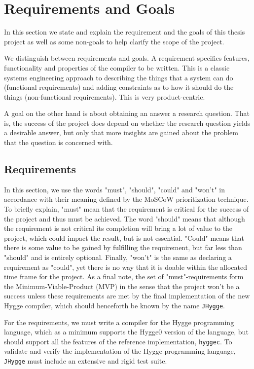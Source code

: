 \chapter{Requirements and Goals} \label{sec:requirements}

In this section we state and explain the requirement and the goals of this thesis project as well as some non-goals to help clarify the scope
of the project.

We distinguish between requirements and goals. A requirement specifies features, functionality and properties of the compiler to be written.
This is a classic systems engineering approach to describing the things that a system can do (functional requirements) and adding constraints as
to how it should do the things (non-functional requirements). This is very product-centric.

A goal on the other hand is about obtaining an answer a research question. That is, the success of the project does depend on whether the research
question yields a desirable answer, but only that more insights are gained about the problem that the question is concerned with.

\section{Requirements}

In this section, we use the words "must", "should", "could" and "won't" in accordance with their meaning defined by the MoSCoW prioritization
technique. To briefly explain, "must" mean that the requirement is critical for the success of the project and thus must be achieved. The
word "should" means that although the requirement is not critical its completion will bring a lot of value to the project, which could impact
the result, but is not essential. "Could" means that there is some value to be gained by fulfilling the requirement, but far less than "should"
and is entirely optional.
Finally, "won't" is the same as declaring a requirement as "could", yet there is no way that it is doable within the allocated time frame for the project.
As a final note, the set of "must"-requirements form the Minimum-Viable-Product (MVP) in the sense that the project won't be a success unless these
requirements are met by the final implementation of the new Hygge compiler, which should henceforth be known by the name \texttt{JHygge}.

For the requirements, we must write a compiler for the Hygge programming language, which as a minimum supports the Hygge0 version of the language,
but should support all the features of the reference implementation, \texttt{hyggec}.
To validate and verify the implementation of the Hygge programming language, \texttt{JHygge} must include an extensive and rigid test suite.

